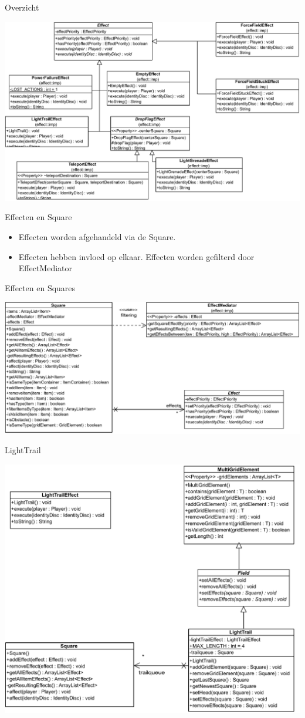 \documentclass[11pt,t]{beamer}
\begin{document}
\begin{frame}{Overzicht}
\begin{center}
\includegraphics[width=0.8\linewidth]{images/effectenoverview}
\end{center}
\end{frame}
\begin{frame}{Effecten en Square}
\begin{itemize}
\item Effecten worden afgehandeld via de Square.
\item Effecten hebben invloed op elkaar. Effecten worden gefilterd door EffectMediator
\end{itemize}
\end{frame}

\begin{frame}{Effecten en Squares}
\vspace{0.2in}
\begin{center}
\includegraphics[width=0.9\linewidth]{images/squareeffect}
\end{center}
\end{frame}


\begin{frame}{LightTrail}
\begin{center}
\includegraphics[width=0.6\linewidth]{images/lighttrail}
\end{center}
\end{frame}
\end{document}
